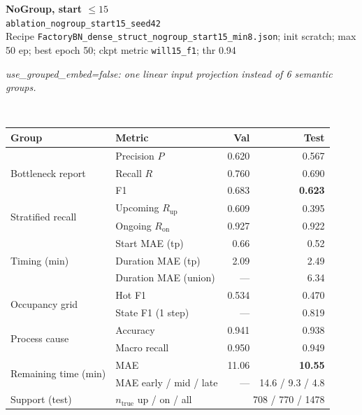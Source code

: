 \documentclass[9pt,a4paper,twocolumn]{extarticle}
\begin{document}
\noindent\begin{minipage}{\columnwidth}
\begin{center}
{\small\bfseries NoGroup, start $\le 15$}\\
{\scriptsize\texttt{ablation\_nogroup\_start15\_seed42}}\\
{\scriptsize Recipe \texttt{FactoryBN\_dense\_struct\_nogroup\_start15\_min8.json}; init scratch; max 50 ep; best epoch 50; ckpt metric \texttt{will15\_f1}; thr 0.94}\\[1pt]
\parbox{0.96\columnwidth}{\scriptsize\itshape use\_grouped\_embed=false: one linear input projection instead of 6 semantic groups.}\\[2pt]
\scriptsize\setlength{\tabcolsep}{3pt}
\begin{tabular}{llrr}
\toprule
Group & Metric & Val & Test \\
\midrule
\multirow{3}{*}{Bottleneck report}
  & Precision $P$ & 0.620 & 0.567 \\
  & Recall $R$ & 0.760 & 0.690 \\
  & F1 & 0.683 & \textbf{0.623} \\
\midrule
\multirow{2}{*}{Stratified recall}
  & Upcoming $R_{\mathrm{up}}$ & 0.609 & 0.395 \\
  & Ongoing $R_{\mathrm{on}}$ & 0.927 & 0.922 \\
\midrule
\multirow{3}{*}{Timing (min)}
  & Start MAE (tp) & 0.66 & 0.52 \\
  & Duration MAE (tp) & 2.09 & 2.49 \\
  & Duration MAE (union) & --- & 6.34 \\
\midrule
\multirow{2}{*}{Occupancy grid}
  & Hot F1 & 0.534 & 0.470 \\
  & State F1 (1 step) & --- & 0.819 \\
\midrule
\multirow{2}{*}{Process cause}
  & Accuracy & 0.941 & 0.938 \\
  & Macro recall & 0.950 & 0.949 \\
\midrule
\multirow{2}{*}{Remaining time (min)}
  & MAE & 11.06 & \textbf{10.55} \\
  & MAE early / mid / late & --- & 14.6 / 9.3 / 4.8 \\
\midrule
Support (test)
  & $n_{\mathrm{true}}$ up / on / all & \multicolumn{2}{r}{708 / 770 / 1478} \\
\bottomrule
\end{tabular}
\end{center}
\end{minipage}\par\vspace{6pt}
\end{document}
